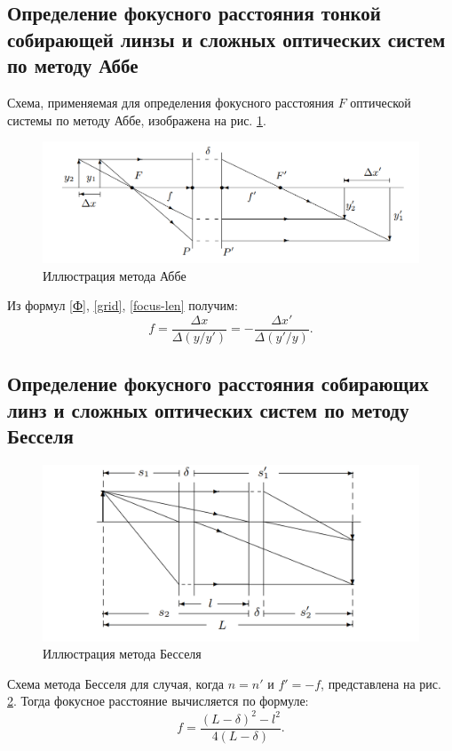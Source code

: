 \documentclass[a4paper]{article}
\newcommand{\picref}[1]{рис. \ref{#1}}
\begin{document}
\subsection{Определение фокусного расстояния тонкой собирающей линзы и сложных оптических систем по методу Аббе}

Схема, применяемая для определения фокусного расстояния $ F $ оптической системы по методу Аббе, изображена на \picref{1}.
\begin{figure}[tbp]
	\centering
	\includegraphics[width=0.8\linewidth]{Screenshot_3}
	\caption{Иллюстрация метода Аббе}
	\label{1}
\end{figure}

Из формул \eqref{Ф}, \eqref{grid}, \eqref{focus-len} получим:
\begin{equation}\label{abbe}
	f = \frac{\Delta x}{\Delta (y/y')} = -\frac{\Delta x'}{\Delta (y'/y)}.
\end{equation}

\subsection{Определение фокусного расстояния собирающих линз и сложных оптических систем по методу Бесселя}

\begin{figure}[tbp]
	\centering
	\includegraphics[width=0.8\linewidth]{Screenshot_2}
	\caption{Иллюстрация метода Бесселя}
	\label{3}
\end{figure}
Схема метода Бесселя для случая, когда $n = n'$ и $f' = -f$, представлена на \picref{3}. Тогда фокусное расстояние вычисляется по формуле:
\begin{equation}\label{Bessel}
	f = \frac{(L - \delta)^2 - l^2}{4(L-\delta)}.
\end{equation}
\end{document}
